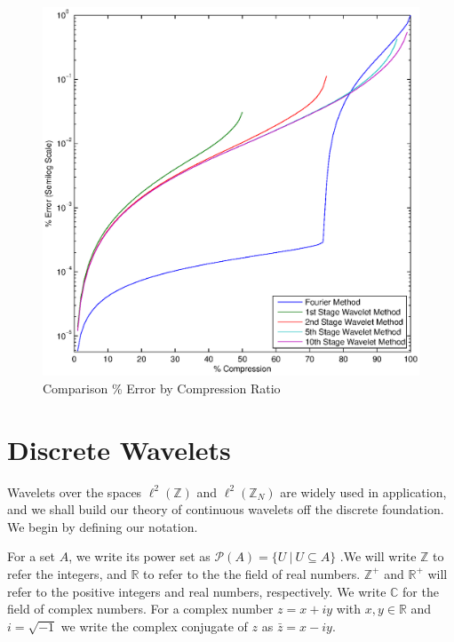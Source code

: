 \documentclass{report}
\newcommand{\Z}{\mathbb{Z}}
\newcommand{\R}{\mathbb{R}}
\newcommand{\C}{\mathbb{C}}
\newcommand{\pow}{\mathcal{P}}
\begin{document}
\begin{figure}
	\center
	\caption{Comparison \% Error by Compression Ratio}
	\label{fig:err}
	\includegraphics[width=12cm]{errorsPlot}
\end{figure}


\chapter{Discrete Wavelets}
\label{ch:techintro}

Wavelets over the spaces $\ell^2 (\Z)$ and $\ell^2 (\Z_N)$ are widely used in application, and we shall build our theory of continuous wavelets off the discrete foundation.   We begin by defining our notation.

 For a set $A$, we write its power set as $\pow (A)=\{ U \ | \ U \subseteq A \}$ .We will write $\Z$ to refer the integers, and $\R$ to refer to the the field of real numbers. $\Z^+$ and $\R^+$ will refer to the positive integers and real numbers, respectively. We write $\C$ for the field of complex numbers. For a complex number $z= x + iy$ with $x,y \in \R$ and $i =\sqrt{-1}$ we write the {complex conjugate} of $z$ as $\bar z = x - iy$.
\end{document}
